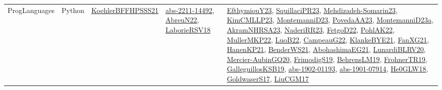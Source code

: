 {\begin{longtable}{lp{3cm}>{\raggedright}p{6cm}>{\raggedright}p{6cm}p{8cm}}
ProgLanguages & Python & \href{articles/KoehlerBFFHPSSS21.pdf}{KoehlerBFFHPSSS21}\cite{KoehlerBFFHPSSS21} & \href{articles/abs-2211-14492.pdf}{abs-2211-14492}\cite{abs-2211-14492}, \href{articles/AbreuN22.pdf}{AbreuN22}\cite{AbreuN22}, \href{articles/LaborieRSV18.pdf}{LaborieRSV18}\cite{LaborieRSV18} & \href{papers/EfthymiouY23.pdf}{EfthymiouY23}\cite{EfthymiouY23}, \href{papers/SquillaciPR23.pdf}{SquillaciPR23}\cite{SquillaciPR23}, \href{papers/Mehdizadeh-Somarin23.pdf}{Mehdizadeh-Somarin23}\cite{Mehdizadeh-Somarin23}, \href{papers/KimCMLLP23.pdf}{KimCMLLP23}\cite{KimCMLLP23}, \href{articles/MontemanniD23.pdf}{MontemanniD23}\cite{MontemanniD23}, \href{papers/PovedaAA23.pdf}{PovedaAA23}\cite{PovedaAA23}, \href{articles/MontemanniD23a.pdf}{MontemanniD23a}\cite{MontemanniD23a}, \href{articles/AkramNHRSA23.pdf}{AkramNHRSA23}\cite{AkramNHRSA23}, \href{articles/NaderiRR23.pdf}{NaderiRR23}\cite{NaderiRR23}, \href{articles/FetgoD22.pdf}{FetgoD22}\cite{FetgoD22}, \href{articles/PohlAK22.pdf}{PohlAK22}\cite{PohlAK22}, \href{articles/MullerMKP22.pdf}{MullerMKP22}\cite{MullerMKP22}, \href{papers/LuoB22.pdf}{LuoB22}\cite{LuoB22}, \href{articles/CampeauG22.pdf}{CampeauG22}\cite{CampeauG22}, \href{papers/KlankeBYE21.pdf}{KlankeBYE21}\cite{KlankeBYE21}, \href{articles/FanXG21.pdf}{FanXG21}\cite{FanXG21}, \href{papers/HanenKP21.pdf}{HanenKP21}\cite{HanenKP21}, \href{papers/BenderWS21.pdf}{BenderWS21}\cite{BenderWS21}, \href{articles/AbohashimaEG21.pdf}{AbohashimaEG21}\cite{AbohashimaEG21}, \href{articles/LunardiBLRV20.pdf}{LunardiBLRV20}\cite{LunardiBLRV20}, \href{papers/Mercier-AubinGQ20.pdf}{Mercier-AubinGQ20}\cite{Mercier-AubinGQ20}, \href{papers/FrimodigS19.pdf}{FrimodigS19}\cite{FrimodigS19}, \href{papers/BehrensLM19.pdf}{BehrensLM19}\cite{BehrensLM19}, \href{papers/FrohnerTR19.pdf}{FrohnerTR19}\cite{FrohnerTR19}, \href{papers/GalleguillosKSB19.pdf}{GalleguillosKSB19}\cite{GalleguillosKSB19}, \href{articles/abs-1902-01193.pdf}{abs-1902-01193}\cite{abs-1902-01193}, \href{articles/abs-1901-07914.pdf}{abs-1901-07914}\cite{abs-1901-07914}, \href{papers/He0GLW18.pdf}{He0GLW18}\cite{He0GLW18}, \href{papers/GoldwaserS17.pdf}{GoldwaserS17}\cite{GoldwaserS17}, \href{papers/LiuCGM17.pdf}{LiuCGM17}\cite{LiuCGM17}\\

\end{longtable}}
